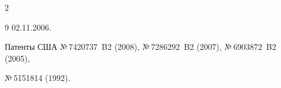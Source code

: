 \begin{multicols}{2}
{{\begin{thebibliography}{9}
02.11.2006.



  \label{end\stat}

  


  Патенты США №\,7420737~B2 (2008), №\,7286292~B2 (2007), №\,6903872~B2 (2005), 

№\,5151814 (1992).

  

  

 




\end{thebibliography}

}

}

\end{multicols}  

 

 

 

